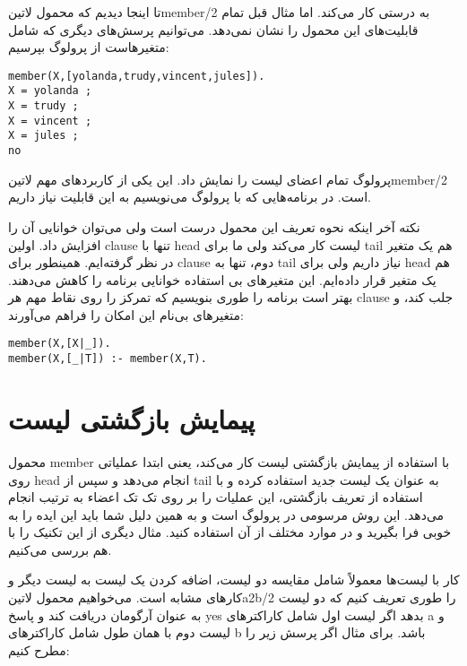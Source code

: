 تا اینجا دیدیم که محمول ‌لاتین{member/2} به درستی کار می‌کند. اما مثال قبل تمام قابلیت‌های این محمول را نشان نمی‌دهد. می‌توانیم پرسش‌های دیگری که شامل متغیرهاست از پرولوگ بپرسیم:

\begin{latin}
\begin{lstlisting}
member(X,[yolanda,trudy,vincent,jules]).
X = yolanda ;
X = trudy ;
X = vincent ;
X = jules ;
no
\end{lstlisting}
\end{latin}

پرولوگ تمام اعضای لیست را نمایش داد. این یکی از کاربردهای مهم ‌لاتین{member/2} است. در برنامه‌هایی که با پرولوگ می‌نویسیم به این قابلیت نیاز داریم.

نکته آخر اینکه نحوه تعریف این محمول درست است ولی می‌توان خوانایی آن را افزایش داد. اولین clause تنها با head لیست کار می‌کند ولی ما برای tail هم یک متغیر در نظر گرفته‌ایم. همینطور برای clause دوم، تنها به tail نیاز داریم ولی برای head هم یک متغیر قرار داده‌ایم. این متغیرهای بی استفاده خوانایی برنامه را کاهش می‌دهند. بهتر است برنامه را طوری بنویسیم که تمرکز را روی نقاط مهم هر clause جلب کند، و متغیرهای بی‌نام این امکان را فراهم می‌آورند:

\begin{latin}
\begin{lstlisting}
member(X,[X|_]).
member(X,[_|T]) :- member(X,T).
\end{lstlisting}
\end{latin}

\section{پیمایش بازگشتی لیست}
محمول member با استفاده از پیمایش بازگشتی لیست کار می‌کند، یعنی ابتدا عملیاتی روی head انجام می‌دهد و سپس از tail به عنوان یک لیست جدید استفاده کرده و با استفاده از تعریف بازگشتی، این عملیات را بر روی تک تک اعضاء به ترتیب انجام می‌دهد. این روش مرسومی در پرولوگ است و به همین دلیل شما باید این ایده را به خوبی فرا بگیرید و در موارد مختلف از آن استفاده کنید. مثال دیگری از این تکنیک را با هم بررسی می‌کنیم.

کار با لیست‌ها معمولاً شامل مقایسه دو لیست، اضافه کردن یک لیست به لیست دیگر و کارهای مشابه است. می‌خواهیم محمول ‌لاتین{a2b/2} را طوری تعریف کنیم که دو لیست به عنوان آرگومان دریافت کند و پاسخ yes بدهد اگر لیست اول شامل کاراکترهای a و لیست دوم با همان طول شامل کاراکترهای b باشد. برای مثال اگر پرسش زیر را مطرح کنیم:

